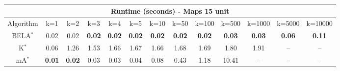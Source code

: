 \begin{tabular}{c|cccccccccccc}\toprule
\multicolumn{13}{c}{Runtime (seconds) - Maps 15 unit}\\ \midrule
Algorithm & k=1 & k=2 & k=3 & k=4 & k=5 & k=10 & k=50 & k=100 & k=500 & k=1000 & k=5000 & k=10000 \\ \midrule
BELA$^*$ & 0.02 & 0.02 & \textbf{0.02} & \textbf{0.02} & \textbf{0.02} & \textbf{0.02} & \textbf{0.02} & \textbf{0.02} & \textbf{0.03} & \textbf{0.03} & \textbf{0.06} & \textbf{0.11} \\
K$^*$ & 0.06 & 1.26 & 1.53 & 1.66 & 1.67 & 1.66 & 1.68 & 1.69 & 1.80 & 1.91 & -- & -- \\
mA$^*$ & \textbf{0.01} & \textbf{0.02} & 0.03 & 0.03 & 0.04 & 0.08 & 0.43 & 1.18 & 10.41 & -- & -- & -- \\ \bottomrule 
\end{tabular}
